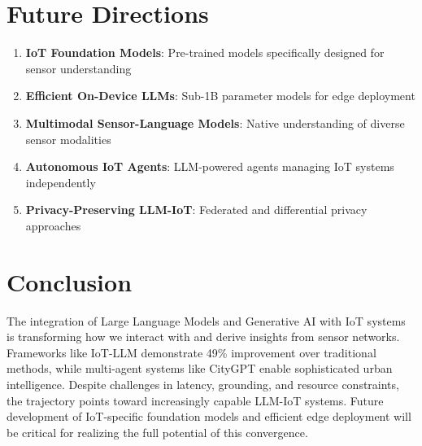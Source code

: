\documentclass[12pt,a4paper]{article}
\begin{document}
\section{Future Directions}

\begin{enumerate}
    \item \textbf{IoT Foundation Models}: Pre-trained models specifically designed for sensor understanding
    \item \textbf{Efficient On-Device LLMs}: Sub-1B parameter models for edge deployment
    \item \textbf{Multimodal Sensor-Language Models}: Native understanding of diverse sensor modalities
    \item \textbf{Autonomous IoT Agents}: LLM-powered agents managing IoT systems independently
    \item \textbf{Privacy-Preserving LLM-IoT}: Federated and differential privacy approaches
\end{enumerate}

\section{Conclusion}

The integration of Large Language Models and Generative AI with IoT systems is transforming how we interact with and derive insights from sensor networks. Frameworks like IoT-LLM demonstrate 49\% improvement over traditional methods, while multi-agent systems like CityGPT enable sophisticated urban intelligence. Despite challenges in latency, grounding, and resource constraints, the trajectory points toward increasingly capable LLM-IoT systems. Future development of IoT-specific foundation models and efficient edge deployment will be critical for realizing the full potential of this convergence.
\end{document}
